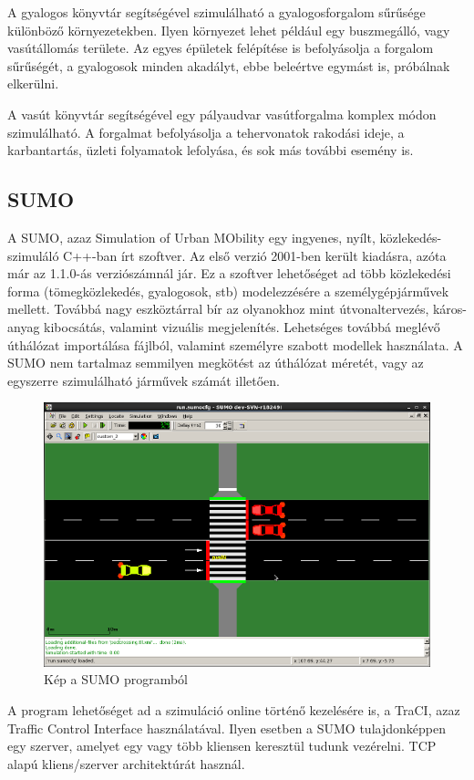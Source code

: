 A gyalogos könyvtár segítségével szimulálható a gyalogosforgalom sűrűsége különböző környezetekben. Ilyen környezet lehet például egy buszmegálló, vagy vasútállomás területe. Az egyes épületek
felépítése is befolyásolja a forgalom sűrűségét, a gyalogosok minden akadályt, ebbe beleértve egymást is, próbálnak elkerülni.

A vasút könyvtár segítségével egy pályaudvar vasútforgalma komplex módon szimulálható. A forgalmat befolyásolja a tehervonatok rakodási ideje, a karbantartás, üzleti folyamatok lefolyása, és sok
más további esemény is.
\subsection{SUMO}

A SUMO, azaz Simulation of Urban MObility egy ingyenes, nyílt, közlekedés-szimuláló C++-ban írt szoftver. Az első verzió 2001-ben került kiadásra, azóta már az 1.1.0-ás verziószámnál jár. Ez a szoftver lehetőséget ad több közlekedési forma (tömegközlekedés, gyalogosok, stb)
modelezzésére a személygépjárművek mellett. Továbbá nagy eszköztárral bír az olyanokhoz mint útvonaltervezés, káros-anyag kibocsátás, valamint vizuális megjelenítés.
Lehetséges továbbá meglévő úthálózat importálása fájlból, valamint személyre szabott modellek használata. A SUMO nem tartalmaz semmilyen megkötést az úthálózat méretét, vagy az egyszerre szimulálható járművek számát illetően.
\begin{figure}[h]
\includegraphics[width=\linewidth]{SUMO.png}
\caption{Kép a SUMO programból}
\label{fig:SUMO}
\end{figure}

A program lehetőséget ad a szimuláció online történő kezelésére is, a TraCI, azaz Traffic Control Interface használatával. Ilyen esetben a SUMO tulajdonképpen egy szerver, amelyet
egy vagy több kliensen keresztül tudunk vezérelni. TCP alapú kliens/szerver architektúrát használ. 

